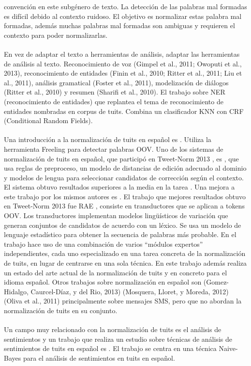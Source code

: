 \documentclass[14pt]{extarticle}
\theoremstyle{definition}
\theoremstyle{remark}
\begin{document}
convención en este subgénero de texto. La detección de las palabras mal formadas es difícil debido al contexto ruidoso. El objetivo es normalizar estas palabra mal formadas, además muchas palabras mal formadas son ambiguas y requieren el contexto para poder normalizarlas.\\\\En vez de adaptar el texto a herramientas de análisis, adaptar las herramientas de análisis al texto. Reconocimiento de voz (Gimpel et al., 2011; Owoputi et al., 2013), reconocimiento de entidades (Finin et al., 2010; Ritter et al., 2011; Liu et al., 2011), análisis gramatical (Foster et al., 2011), modelización de diálogos (Ritter et al., 2010) y resumen (Sharifi et al., 2010). El trabajo \citep{liu:2011} sobre NER (reconocimiento de entidades) que replantea el tema de reconocimiento de entidades nombradas en corpus de tuits. Combina un clasificador KNN con CRF (Conditional Random Fields).
\\\\Una introducción a la normalización de tuits en español es \citep{alegria:2013}\citep{alegria:2015}. Utiliza la herramienta Freeling \citep{freeling} para detectar palabras OOV. Uno de los sistemas de normalización de tuits en español, que participó en Tweet-Norm 2013 \citep{alegria:2013}, es \citep{ruizcuadros:2013}\citep{vicomtech}, que usa reglas de preproceso, un modelo de distancias de edición adecuado al dominio y modelos de lengua para seleccionar candidatos de corrección según el contexto. El sistema obtuvo resultados superiores a la media en la tarea \citep{alegria:2013}\citep{tweetnorm}. Una mejora a este trabajo por los mismos autores es \citep{ruizcuadros:2014}. El trabajo que mejores resultados obtuvo en Tweet-Norm 2013 fue RAE \citep{porta:2013}, consiste en transductores que se aplican a tokens OOV. Los transductores implementan modelos lingüísticos de variación que generan conjuntos de candidatos de acuerdo con un léxico. Se usa un modelo de lenguaje estadístico para obtener la secuencia de palabras más probable. En el trabajo \citep{cotelocruz:2015} hace uso de una combinación de varios “módulos expertos” independientes, cada uno especializado en una tarea concreta de la normalización de tuits, en lugar de centrarse en una sola técnica. En este trabajo además realiza un estado del arte actual de la normalización de tuits y en concreto para el idioma español. Otros trabajos sobre normalización en español son (Gomez-Hidalgo, Caurcel-Díaz, y del Rio, 2013) (Mosquera, Lloret, y Moreda, 2012) (Oliva et al., 2011) principalmente sobre mensajes SMS, pero que no abordan la normalización de tuits en su conjunto.
\\\\
Un campo muy relacionado con la normalización de tuits es el análisis de sentimientos y un trabajo que realiza un estudio sobre técnicas de análisis de sentimientos de tuits en español es \citep{fernandezanta:2013}. El trabajo \citep{gamallo:2013} se centra en una técnica Naive-Bayes para el análisis de sentimientos en tuits en español.
\end{document}
